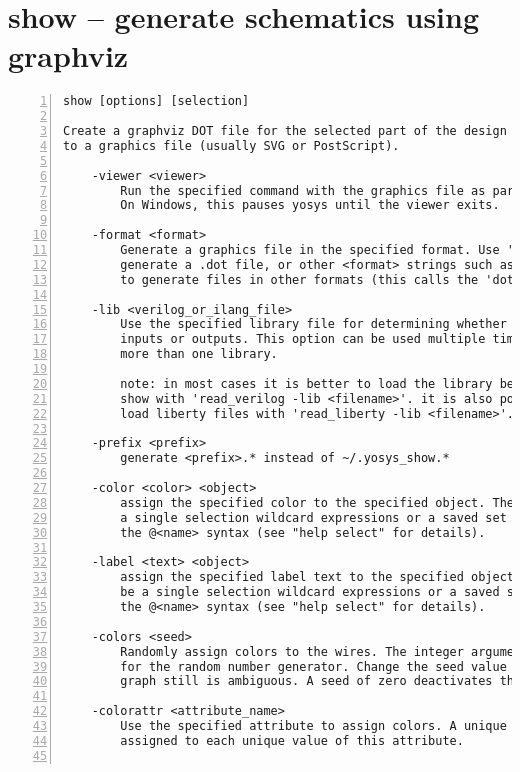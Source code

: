 \section{show -- generate schematics using graphviz}
\label{cmd:show}
\begin{lstlisting}[numbers=left,frame=single]
    show [options] [selection]

Create a graphviz DOT file for the selected part of the design and compile it
to a graphics file (usually SVG or PostScript).

    -viewer <viewer>
        Run the specified command with the graphics file as parameter.
        On Windows, this pauses yosys until the viewer exits.

    -format <format>
        Generate a graphics file in the specified format. Use 'dot' to just
        generate a .dot file, or other <format> strings such as 'svg' or 'ps'
        to generate files in other formats (this calls the 'dot' command).

    -lib <verilog_or_ilang_file>
        Use the specified library file for determining whether cell ports are
        inputs or outputs. This option can be used multiple times to specify
        more than one library.

        note: in most cases it is better to load the library before calling
        show with 'read_verilog -lib <filename>'. it is also possible to
        load liberty files with 'read_liberty -lib <filename>'.

    -prefix <prefix>
        generate <prefix>.* instead of ~/.yosys_show.*

    -color <color> <object>
        assign the specified color to the specified object. The object can be
        a single selection wildcard expressions or a saved set of objects in
        the @<name> syntax (see "help select" for details).

    -label <text> <object>
        assign the specified label text to the specified object. The object can
        be a single selection wildcard expressions or a saved set of objects in
        the @<name> syntax (see "help select" for details).

    -colors <seed>
        Randomly assign colors to the wires. The integer argument is the seed
        for the random number generator. Change the seed value if the colored
        graph still is ambiguous. A seed of zero deactivates the coloring.

    -colorattr <attribute_name>
        Use the specified attribute to assign colors. A unique color is
        assigned to each unique value of this attribute.


\end{lstlisting}
